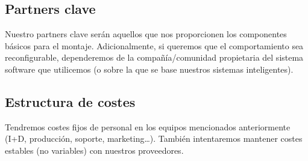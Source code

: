 \subsection{Partners clave}

Nuestro partners clave serán aquellos que nos proporcionen los componentes básicos para el montaje. Adicionalmente, si queremos que el comportamiento sea reconfigurable, dependeremos de la compañía/comunidad propietaria del sistema software que utilicemos (o sobre la que se base nuestros sistemas inteligentes).

\subsection{Estructura de costes}


Tendremos costes fijos de personal en los equipos mencionados anteriormente (I+D, producción, soporte, marketing\dots). También intentaremos mantener costes estables (no variables) con nuestros proveedores.